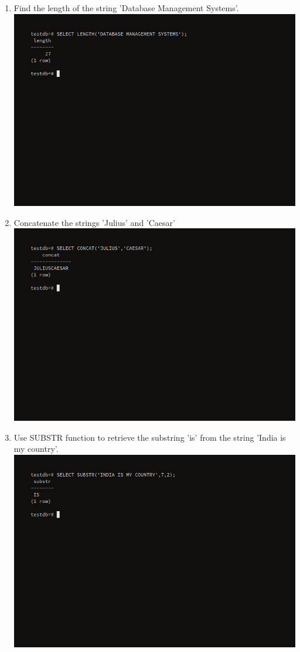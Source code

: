 \documentclass[10pt,a4paper,titlepage]{report}
\begin{document}
{\begin{enumerate}
	\item Find the length of the string 'Database Management Systems'.\newline
	\includegraphics[width=\linewidth]{../Images/Strings/19.png}
	\item Concatenate the strings 'Julius' and 'Caesar'\newline
	\includegraphics[width=\linewidth]{../Images/Strings/20.png}
	\item Use SUBSTR function to retrieve the substring 'is' from the string 'India is my country'.\newline
	\includegraphics[width=\linewidth]{../Images/Strings/21.png}
\end{enumerate}
}
\end{document}
